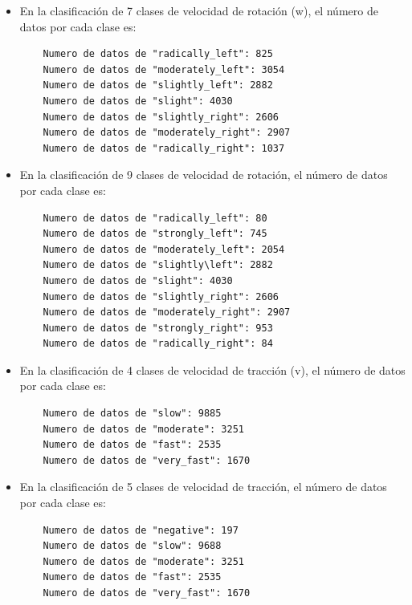 \begin{itemize}
    \item En la clasificación de 7 clases de velocidad de rotación (w), el número de datos por cada clase es:

    \vspace{10pt}
    \begin{lstlisting}
    Numero de datos de "radically_left": 825
    Numero de datos de "moderately_left": 3054
    Numero de datos de "slightly_left": 2882
    Numero de datos de "slight": 4030
    Numero de datos de "slightly_right": 2606
    Numero de datos de "moderately_right": 2907
    Numero de datos de "radically_right": 1037
    \end{lstlisting}
    \vspace{20pt}


    \item En la clasificación de 9 clases de velocidad de rotación,  el número de datos por cada clase es:

    \vspace{10pt}
    \begin{lstlisting}
    Numero de datos de "radically_left": 80 
    Numero de datos de "strongly_left": 745
    Numero de datos de "moderately_left": 2054
    Numero de datos de "slightly\left": 2882
    Numero de datos de "slight": 4030
    Numero de datos de "slightly_right": 2606
    Numero de datos de "moderately_right": 2907
    Numero de datos de "strongly_right": 953
    Numero de datos de "radically_right": 84
    \end{lstlisting}
    \vspace{20pt}


    \item En la clasificación de 4 clases de velocidad de tracción (v),  el número de datos por cada clase es:

    \vspace{10pt}
    \begin{lstlisting}
    Numero de datos de "slow": 9885
    Numero de datos de "moderate": 3251
    Numero de datos de "fast": 2535
    Numero de datos de "very_fast": 1670
    \end{lstlisting}
    \vspace{20pt}

    \item En la clasificación de 5 clases de velocidad de tracción,  el número de datos por cada clase es:

    \vspace{10pt}
    \begin{lstlisting}
    Numero de datos de "negative": 197
    Numero de datos de "slow": 9688
    Numero de datos de "moderate": 3251
    Numero de datos de "fast": 2535
    Numero de datos de "very_fast": 1670
    \end{lstlisting}
    \vspace{20pt}

\end{itemize}


